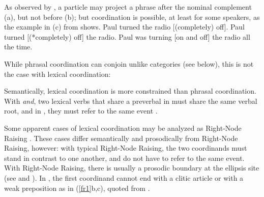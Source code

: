 \eal
{}
\zl

As observed by \citet[--177]{hpsg1}, a particle may project a phrase after the nominal
complement (a), but not before (b); but coordination is possible, at least for some
speakers, as the example in (c) from  shows.
\eal
\ex Paul turned the radio [(completely) off].
\ex Paul turned [(*completely) off] the radio.
\ex Paul was turning [on and off] the radio all the time.
\zl

While phrasal coordination can conjoin unlike categories (see below), this is not the case with lexical coordination:

\eal
{}
\zl

Semantically, lexical coordination is more constrained than phrasal coordination. With \textit{and},
two lexical verbs that share a preverbal  in  must share the same verbal root, and in
, they must refer to the same event \citep{Bosque:86}.

\eal
{}
\zl

Some apparent cases of lexical coordination may be analyzed as Right-Node Raising
\citep{Beavers}. These cases differ semantically and prosodically from Right-Node Raising, however: with typical Right-Node
Raising, the two coordinands must stand in contrast to one another, and do not have to refer to the
same event. With Right-Node Raising, there is usually a prosodic boundary at the ellipsis site (see
\citealt[843--844]{chavesrnr} and ). In , the first coordinand cannot end with a clitic article or with a weak preposition as in (\ref{fr1}b,c), quoted from \citep[]{Abeille:06}.

